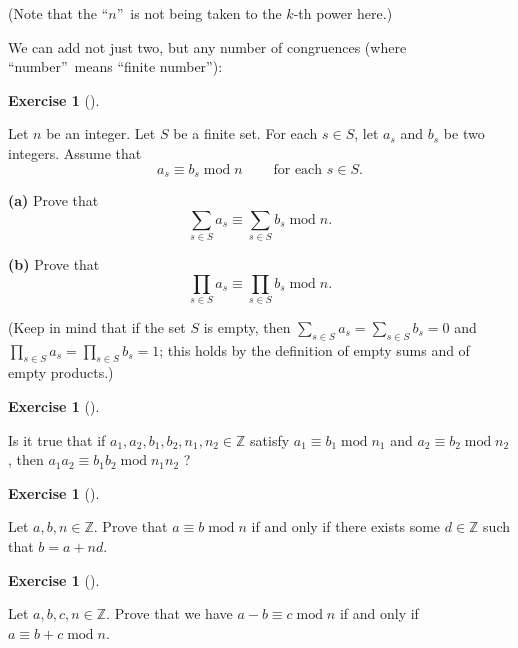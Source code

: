 \documentclass[numbers=enddot,12pt,final,onecolumn,notitlepage]{scrartcl}%
\newcounter{exer}
\numberwithin{exer}{subsection}
\theoremstyle{definition}
\newtheorem{exmp}[exer]{Exercise}
\newenvironment{exercise}[1][]
{\begin{exmp}[#1]\begin{leftbar}}
{\end{leftbar}\end{exmp}}
\let\sumnonlimits\sum
\let\prodnonlimits\prod
\renewcommand{\sum}{\sumnonlimits\limits}
\renewcommand{\prod}{\prodnonlimits\limits}
\begin{document}
(Note that the \textquotedblleft$n$\textquotedblright\ is not being taken to
the $k$-th power here.)

We can add not just two, but any number of congruences (where
\textquotedblleft number\textquotedblright\ means \textquotedblleft finite
number\textquotedblright):

\begin{exercise}
\label{exe.ent.mod.k-sum}Let $n$ be an integer. Let $S$ be a finite set. For
each $s\in S$, let $a_{s}$ and $b_{s}$ be two integers. Assume that%
\begin{equation}
a_{s}\equiv b_{s}\operatorname{mod}n\ \ \ \ \ \ \ \ \ \ \text{for each }s\in
S. \label{eq.exe.ent.mod.k-sum.ass}%
\end{equation}


\textbf{(a)} Prove that%
\begin{equation}
\sum_{s\in S}a_{s}\equiv\sum_{s\in S}b_{s}\operatorname{mod}n.
\label{eq.exe.ent.mod.k-sum.a}%
\end{equation}


\textbf{(b)} Prove that
\begin{equation}
\prod_{s\in S}a_{s}\equiv\prod_{s\in S}b_{s}\operatorname{mod}n.
\label{eq.exe.ent.mod.k-sum.b}%
\end{equation}


(Keep in mind that if the set $S$ is empty, then $\sum_{s\in S}a_{s}%
=\sum_{s\in S}b_{s}=0$ and $\prod_{s\in S}a_{s}=\prod_{s\in S}b_{s}=1$; this
holds by the definition of empty sums and of empty products.)
\end{exercise}

\begin{exercise}
\label{exe.ent.mod.prod-wrong}Is it true that if $a_{1},a_{2},b_{1}%
,b_{2},n_{1},n_{2}\in\mathbb{Z}$ satisfy $a_{1}\equiv b_{1}\operatorname{mod}%
n_{1}$ and $a_{2}\equiv b_{2}\operatorname{mod}n_{2}$, then $a_{1}a_{2}\equiv
b_{1}b_{2}\operatorname{mod}n_{1}n_{2}$ ?
\end{exercise}

\begin{exercise}
\label{exe.ent.mod.a+nd}Let $a,b,n\in\mathbb{Z}$. Prove that $a\equiv
b\operatorname{mod}n$ if and only if there exists some $d\in\mathbb{Z}$ such
that $b=a+nd$.
\end{exercise}

\begin{exercise}
\label{exe.ent.mod.diff}Let $a,b,c,n\in\mathbb{Z}$. Prove that we have
$a-b\equiv c\operatorname{mod}n$ if and only if $a\equiv b+c\operatorname{mod}%
n$.
\end{exercise}
\end{document}
